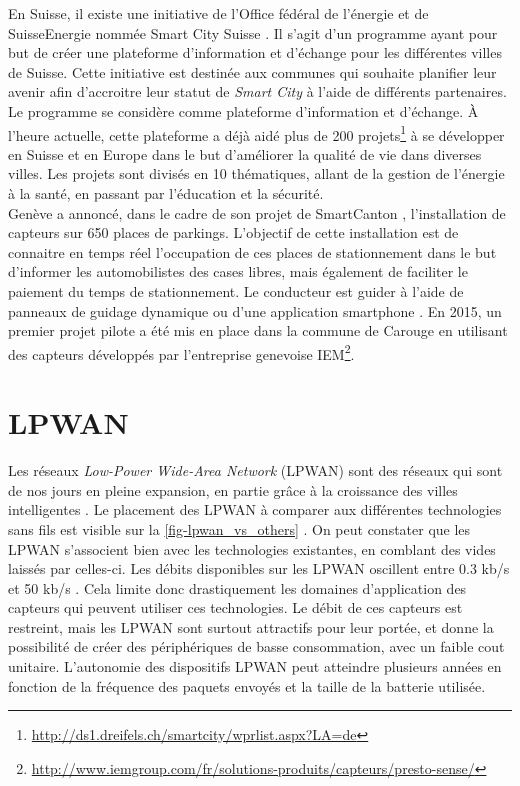 En Suisse, il existe une initiative de l’Office fédéral de l’énergie et de SuisseEnergie nommée Smart City Suisse \cite{SmartCitSuisse:online}. Il s'agit d'un programme ayant pour but de créer une plateforme d'information et d'échange pour les différentes villes de Suisse. Cette initiative est 
destinée aux communes qui souhaite planifier leur avenir afin d'accroitre leur statut de \textit{Smart City} à l'aide de différents partenaires. Le programme se considère comme plateforme d’information et d’échange. À l'heure actuelle, cette plateforme a déjà aidé plus de 200 projets\footnote{\url{http://ds1.dreifels.ch/smartcity/wprlist.aspx?LA=de}} à se développer en Suisse et en Europe dans le but d'améliorer la qualité de vie dans diverses villes. Les projets sont divisés en 10 thématiques, allant de la gestion de l'énergie à la santé, en passant par l'éducation et la sécurité.\\

Genève a annoncé, dans le cadre de son projet de SmartCanton \cite{LeTempParkings:online}, l'installation de capteurs sur 650 places de parkings. L'objectif de cette installation est de connaitre en temps réel l'occupation de ces places de stationnement dans le but d'informer les automobilistes des cases libres, mais également de faciliter le paiement du temps de stationnement. Le conducteur est guider à l'aide de panneaux de guidage dynamique ou d'une application smartphone \cite{LeTempParkings:online}. En 2015, un premier projet pilote a été mis en place dans la commune de Carouge en utilisant des capteurs développés par l'entreprise genevoise IEM\footnote{\url{http://www.iemgroup.com/fr/solutions-produits/capteurs/presto-sense/}}. 

\section{LPWAN}
\label{sec-stateOfTheArt_LPWAN}

Les réseaux \textit{Low-Power Wide-Area Network} (LPWAN) sont des réseaux qui sont de nos jours en pleine expansion, en partie grâce à la croissance des villes intelligentes \cite{LPWANWik63:online}. Le placement des LPWAN à comparer aux différentes technologies sans fils est visible sur la \cref{fig-lpwan_vs_others} \cite{LPWANisL94:online}. On peut constater que les LPWAN s'associent bien avec les technologies existantes, en comblant des vides laissés par celles-ci. Les débits disponibles sur les LPWAN oscillent entre 0.3 kb/s et 50 kb/s \cite{1607080117:online}. Cela limite donc drastiquement les domaines d'application des capteurs qui peuvent utiliser ces technologies. Le débit de ces capteurs est restreint, mais les LPWAN sont surtout attractifs pour leur portée, et donne la possibilité de créer des périphériques de basse consommation, avec un faible cout unitaire. L'autonomie des dispositifs LPWAN peut atteindre plusieurs années en fonction de la fréquence des paquets envoyés et la taille de la batterie utilisée.

